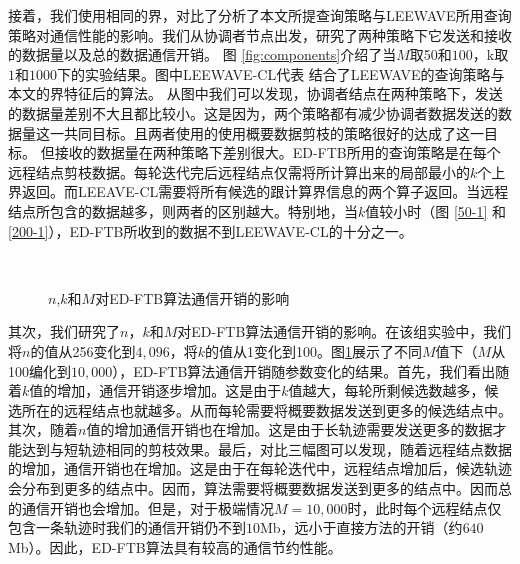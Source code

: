 接着，我们使用相同的界，对比了分析了本文所提查询策略与LEEWAVE所用查询策略对通信性能的影响。我们从协调者节点出发，研究了两种策略下它发送和接收的数据量以及总的数据通信开销。
图 \ref{fig:components}介绍了当$M$取50和$100$，k取$1$和$1000$下的实验结果。图中LEEWAVE-CL代表
结合了LEEWAVE的查询策略与本文的界特征后的算法。
从图中我们可以发现，协调者结点在两种策略下，发送的数据量差别不大且都比较小。这是因为，两个策略都有减少协调者数据发送的数据量这一共同目标。且两者使用的使用概要数据剪枝的策略很好的达成了这一目标。
但接收的数据量在两种策略下差别很大。ED-FTB所用的查询策略是在每个远程结点剪枝数据。每轮迭代完后远程结点仅需将所计算出来的局部最小的$k$个上界返回。而LEEAVE-CL需要将所有候选的跟计算界信息的两个算子返回。当远程结点所包含的数据越多，则两者的区别越大。特别地，当$k$值较小时（图 \ref{50-1} 和 \ref{200-1}），ED-FTB所收到的数据不到LEEWAVE-CL的十分之一。


\begin{figure}[t]
	\centering
		\centering
	\\
		\caption{$n$,$k$和$M$对ED-FTB算法通信开销的影响}
		\label{fig:costKM}
\end{figure}
其次，我们研究了$n$，$k$和$M$对ED-FTB算法通信开销的影响。在该组实验中，我们将$n$的值从256变化到$4,096$，将$k$的值从1变化到100。图\ref{fig:costKM}展示了不同$M$值下（$M$从100编化到$10,000$），ED-FTB算法通信开销随参数变化的结果。首先，我们看出随着$k$值的增加，通信开销逐步增加。这是由于$k$值越大，每轮所剩候选数越多，候选所在的远程结点也就越多。从而每轮需要将概要数据发送到更多的候选结点中。其次，随着$n$值的增加通信开销也在增加。这是由于长轨迹需要发送更多的数据才能达到与短轨迹相同的剪枝效果。最后，对比三幅图可以发现，随着远程结点数据的增加，通信开销也在增加。这是由于在每轮迭代中，远程结点增加后，候选轨迹会分布到更多的结点中。因而，算法需要将概要数据发送到更多的结点中。因而总的通信开销也会增加。但是，对于极端情况$M=10,000$时，此时每个远程结点仅包含一条轨迹时我们的通信开销仍不到$10$Mb，远小于直接方法的开销（约$640$Mb）。因此，ED-FTB算法具有较高的通信节约性能。

